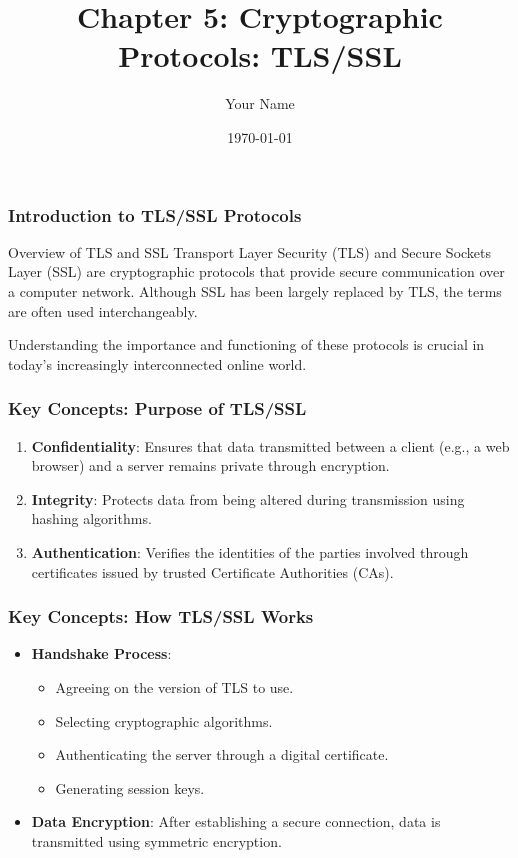 \documentclass{beamer}
\title{Chapter 5: Cryptographic Protocols: TLS/SSL}
\author{Your Name}
\institute{Your Institution}
\date{\today}
\begin{document}
\frame{\titlepage}

\begin{frame}[fragile]
    \titlepage
\end{frame}

\begin{frame}[fragile]
    \frametitle{Introduction to TLS/SSL Protocols}
    \begin{block}{Overview of TLS and SSL}
        Transport Layer Security (TLS) and Secure Sockets Layer (SSL) are cryptographic protocols that provide secure communication over a computer network. 
        Although SSL has been largely replaced by TLS, the terms are often used interchangeably.
    \end{block}
    Understanding the importance and functioning of these protocols is crucial in today's increasingly interconnected online world.
\end{frame}

\begin{frame}[fragile]
    \frametitle{Key Concepts: Purpose of TLS/SSL}
    \begin{enumerate}
        \item \textbf{Confidentiality}: Ensures that data transmitted between a client (e.g., a web browser) and a server remains private through encryption.
        \item \textbf{Integrity}: Protects data from being altered during transmission using hashing algorithms.
        \item \textbf{Authentication}: Verifies the identities of the parties involved through certificates issued by trusted Certificate Authorities (CAs).
    \end{enumerate}
\end{frame}

\begin{frame}[fragile]
    \frametitle{Key Concepts: How TLS/SSL Works}
    \begin{itemize}
        \item \textbf{Handshake Process}:
        \begin{itemize}
            \item Agreeing on the version of TLS to use.
            \item Selecting cryptographic algorithms.
            \item Authenticating the server through a digital certificate.
            \item Generating session keys.
        \end{itemize}
        \item \textbf{Data Encryption}: 
        After establishing a secure connection, data is transmitted using symmetric encryption.
    \end{itemize}
\end{frame}
\end{document}
